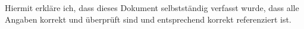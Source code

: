 
Hiermit erkläre ich, dass dieses Dokument selbstständig verfasst wurde, dass alle Angaben korrekt
und überprüft sind und entsprechend korrekt referenziert ist.\newline\newline
\gitAuthorDate~\gitAuthorName